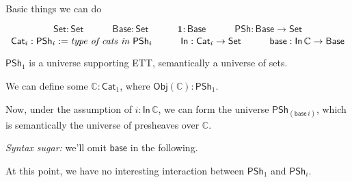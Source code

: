 \documentclass[dvipsnames,aspectratio=169]{beamer}
\newcommand{\ms}[1]{\mathsf{#1}}
\newcommand{\mbb}[1]{\mathbb{#1}}
\newcommand{\mbf}[1]{\mathbf{#1}}
\newcommand{\Set}{\mathsf{Set}}
\newcommand{\Base}{\mathsf{Base}}
\newcommand{\In}{\mathsf{In}}
\newcommand{\PSh}{\mathsf{PSh}}
\newcommand{\Cat}{\mathsf{Cat}}
\newcommand{\base}{\mathsf{base}}
\newcommand{\mbbC}{\mbb{C}}
\begin{document}
\begin{frame}{Basic things we can do}
\begin{block}{}
\vspace{-0.6em}
{\footnotesize
  \[ \Set : \Set \hspace{3em} \Base : \Set \hspace{3em} \mbf{1} : \Base \hspace{3em} \PSh : \Base \to \Set \]
  \[ \Cat_i : \PSh_i := \text{\emph{type of cats in $\PSh_i$}} \hspace{3em} \In : \Cat_i \to \Set \hspace{3em} \base : \In\,\mbbC \to \Base \]
}
\end{block}
\vspace{2em}

$\PSh_1$ is a universe supporting ETT, semantically a universe of sets.
\vspace{1em}

We can define some $\mbbC : \Cat_1$, where $\ms{Obj}(\mbbC) : \PSh_1$.
\vspace{1em}

Now, \alert{under the assumption} of $i : \In\,\mbbC$, we can form the universe $\PSh_{(\base\,i)}$, which is semantically the universe of
presheaves over $\mbbC$.
\vspace{1em}

\emph{Syntax sugar:} we'll omit $\base$ in the following.
\vspace{1em}

At this point, we have no interesting interaction between $\PSh_1$ and $\PSh_i$.
\vspace{3em}

\end{frame}
\end{document}
